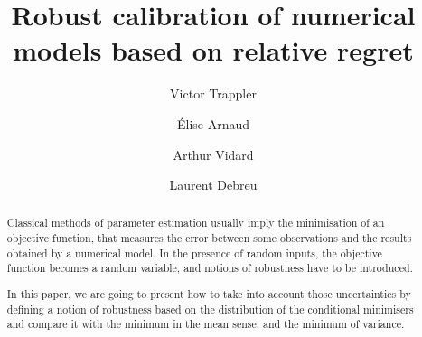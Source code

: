 \documentclass[preprint, 1p]{elsarticle}
\begin{document}
\begin{frontmatter}



\title{Robust calibration of numerical models based on relative regret}


\author[vt]{Victor Trappler}
\author[ea]{Élise Arnaud}
\author[av]{Arthur Vidard}
\author[ld]{Laurent Debreu}

\address[vt]{Univ. Grenoble Alpes, CNRS, Inria, Grenoble INP*, LJK, 38000 Grenoble, France}

\begin{abstract}
Classical methods of parameter estimation usually imply the minimisation of an objective function, that measures the error between some observations and the results obtained by a numerical model. In the presence of random inputs, the objective function becomes a random variable, and notions of robustness have to be introduced.

In this paper, we are going to present how to take into account those uncertainties by defining a notion of robustness based on the distribution of the conditional minimisers and compare it with the minimum in the mean sense, and the minimum of variance.
\end{abstract}



\begin{keyword}



\end{keyword}

\end{frontmatter}
\end{document}
